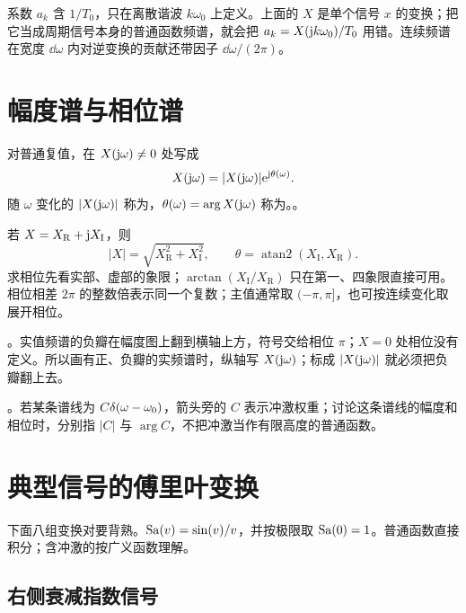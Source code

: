 \begin{pitfall}[混淆级数系数与变换]
  系数 $a_k$ 含 $1/T_0$，只在离散谐波 $k\omega_0$ 上定义。上面的 $X$ 是单个信号 $x$ 的变换；把它当成周期信号本身的普通函数频谱，就会把 $a_k=X(\mathrm{j} k\omega_0)/T_0$ 用错。连续频谱在宽度 $\dd\omega$ 内对逆变换的贡献还带因子 $\dd\omega/(2\pi)$。
\end{pitfall}

\section{幅度谱与相位谱}
\label{sec:ctft-magnitude-phase}

\begin{definition}[幅度谱与相位谱]
  \label{def:ctft-magnitude-phase}
  对普通复值，在 $X(\mathrm{j}\omega)\ne0$ 处写成
  \begin{equation}
    X(\mathrm{j}\omega)=|X(\mathrm{j}\omega)|\mathrm{e}^{\mathrm{j}\theta(\omega)}.
    \label{eq:ctft-polar-spectrum}
  \end{equation}
  随 $\omega$ 变化的 $|X(\mathrm{j}\omega)|$ 称为，$\theta(\omega)=\arg X(\mathrm{j}\omega)$ 称为。。
\end{definition}

若 $X=X_{\mathrm R}+\mathrm{j} X_{\mathrm I}$，则
\[
  |X|=\sqrt{X_{\mathrm R}^2+X_{\mathrm I}^2},\qquad
  \theta=\operatorname{atan2}(X_{\mathrm I},X_{\mathrm R}).
\]
求相位先看实部、虚部的象限；$\arctan(X_{\mathrm I}/X_{\mathrm R})$ 只在第一、四象限直接可用。相位相差 $2\pi$ 的整数倍表示同一个复数；主值通常取 $(-\pi,\pi]$，也可按连续变化取展开相位。

。实值频谱的负瓣在幅度图上翻到横轴上方，符号交给相位 $\pi$；$X=0$ 处相位没有定义。所以画有正、负瓣的实频谱时，纵轴写 $X(\mathrm{j}\omega)$；标成 $|X(\mathrm{j}\omega)|$ 就必须把负瓣翻上去。

。若某条谱线为 $C\delta(\omega-\omega_0)$，箭头旁的 $C$ 表示冲激权重；讨论这条谱线的幅度和相位时，分别指 $|C|$ 与 $\arg C$，不把冲激当作有限高度的普通函数。

\section{典型信号的傅里叶变换}
\label{sec:ctft-basic-pairs}

下面八组变换对要背熟。$\operatorname{Sa}(v)=\sin(v)/v$，并按极限取 $\operatorname{Sa}(0)=1$。普通函数直接积分；含冲激的按广义函数理解。

\subsection{右侧衰减指数信号}
\label{sec:ctft-exponential-pair}

